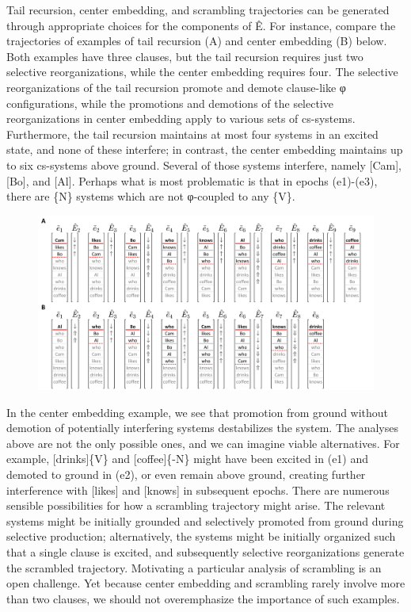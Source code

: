   Tail recursion, center embedding, and scrambling trajectories can be generated through appropriate choices for the components of Ê. For instance, compare the trajectories of examples of tail recursion (A) and center embedding (B) below. Both examples have three clauses, but the tail recursion requires just two selective reorganizations, while the center embedding requires four. The selective reorganizations of the tail recursion promote and demote clause-like φ configurations, while the promotions and demotions of the selective reorganizations in center embedding apply to various sets of cs-systems. Furthermore, the tail recursion maintains at most four systems in an excited state, and none of these interfere; in contrast, the center embedding maintains up to six cs-systems above ground. Several of those systems interfere, namely [Cam], [Bo], and [Al]. Perhaps what is most problematic is that in epochs (e1)-(e3), there are \{N\} systems which are not φ-coupled to any \{V\}.

  
\begin{figure}
\includegraphics[width=\textwidth]{figures/Tilsen-img119.png}
\caption{\missingcaption}
\label{fig:5:15}
\end{figure}
 

  In the center embedding example, we see that promotion from ground without demotion of potentially interfering systems destabilizes the system. The analyses above are not the only possible ones, and we can imagine viable alternatives. For example, [drinks]\{V\} and [coffee]\{-N\} might have been excited in (e1) and demoted to ground in (e2), or even remain above ground, creating further interference with [likes] and [knows] in subsequent epochs. There are numerous sensible possibilities for how a scrambling trajectory might arise. The relevant systems might be initially grounded and selectively promoted from ground during selective production; alternatively, the systems might be initially organized such that a single clause is excited, and subsequently selective reorganizations generate the scrambled trajectory. Motivating a particular analysis of scrambling is an open challenge. Yet because center embedding and scrambling rarely involve more than two clauses, we should not overemphasize the importance of such examples.

